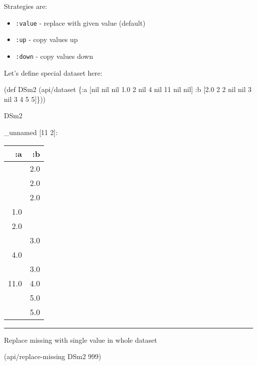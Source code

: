 \documentclass[]{article}
\newenvironment{Shaded}{\begin{snugshade}}{\end{snugshade}}
\newcommand{\DecValTok}[1]{\textcolor[rgb]{0.00,0.00,0.81}{#1}}
\newcommand{\FloatTok}[1]{\textcolor[rgb]{0.00,0.00,0.81}{#1}}
\newcommand{\FunctionTok}[1]{\textcolor[rgb]{0.00,0.00,0.00}{#1}}
\newcommand{\VariableTok}[1]{\textcolor[rgb]{0.00,0.00,0.00}{#1}}
\newcommand{\BuiltInTok}[1]{#1}
\newcommand{\AttributeTok}[1]{\textcolor[rgb]{0.77,0.63,0.00}{#1}}
\newcommand{\NormalTok}[1]{#1}
\providecommand{\tightlist}{%
  \setlength{\itemsep}{0pt}\setlength{\parskip}{0pt}}
\begin{document}
Strategies are:

\begin{itemize}
\tightlist
\item
  \texttt{:value} - replace with given value (default)
\item
  \texttt{:up} - copy values up
\item
  \texttt{:down} - copy values down
\end{itemize}

Let's define special dataset here:

\begin{Shaded}
\begin{Highlighting}[]
\NormalTok{(}\BuiltInTok{def}\FunctionTok{ DSm2 }\NormalTok{(api/dataset \{}\AttributeTok{:a}\NormalTok{ [}\VariableTok{nil} \VariableTok{nil} \VariableTok{nil} \FloatTok{1.0} \DecValTok{2}   \VariableTok{nil} \DecValTok{4}   \VariableTok{nil}  \DecValTok{11} \VariableTok{nil} \VariableTok{nil}\NormalTok{]}
                        \AttributeTok{:b}\NormalTok{ [}\FloatTok{2.0}   \DecValTok{2}   \DecValTok{2} \VariableTok{nil} \VariableTok{nil} \DecValTok{3}   \VariableTok{nil}   \DecValTok{3}  \DecValTok{4}  \DecValTok{5} \DecValTok{5}\NormalTok{]\}))}
\end{Highlighting}
\end{Shaded}

\begin{Shaded}
\begin{Highlighting}[]
\NormalTok{DSm2}
\end{Highlighting}
\end{Shaded}

\_unnamed {[}11 2{]}:

\begin{longtable}[]{@{}rr@{}}
\toprule
:a & :b\tabularnewline
\midrule
\endhead
& 2.0\tabularnewline
& 2.0\tabularnewline
& 2.0\tabularnewline
1.0 &\tabularnewline
2.0 &\tabularnewline
& 3.0\tabularnewline
4.0 &\tabularnewline
& 3.0\tabularnewline
11.0 & 4.0\tabularnewline
& 5.0\tabularnewline
& 5.0\tabularnewline
\bottomrule
\end{longtable}

\begin{center}\rule{0.5\linewidth}{0.5pt}\end{center}

Replace missing with single value in whole dataset

\begin{Shaded}
\begin{Highlighting}[]
\NormalTok{(api/replace-missing DSm2 }\DecValTok{999}\NormalTok{)}
\end{Highlighting}
\end{Shaded}
\end{document}
